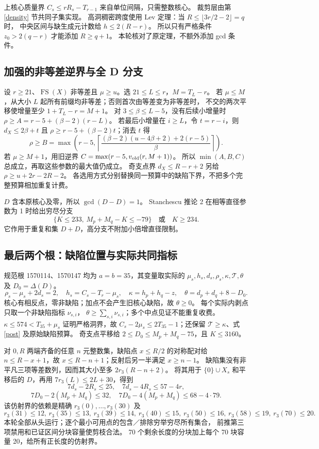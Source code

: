 \documentclass[11pt,a4paper]{article}
\newcommand{\FS}{\operatorname{FS}}
\newcommand{\T}{\mathcal T}
\theoremstyle{definition}
\begin{document}
上核心质量界 $C_s\le rR_s-T_{r-1}$ 来自单位间隔，只需整数核心。
裁剪层由第 \ref{density} 节共同子集实现。
高洞稠密跨度使用 Lev 定理：当 $R\le\lfloor3r/2-2\rfloor=q$ 时，
中央区间与缺生成元计数给 $h\le2(R-r)$。
所以只有严格条件 $z_0>2(q-r)$ 才能添加 $R\ge q+1$。
本轮核对了原定理，不额外添加 gcd 条件。

\subsection{加强的非等差逆界与全 D 分支}
设 $r\ge21$、$\FS(X)$ 非等差且 $\mu\ge u$。选 $21\le L\le r$，$M=T_L-r$。
若 $\mu\le M$，从大小 $L$ 起所有前缀均非等差；否则首次由等差变为非等差时，
不交的两次平移使增量至少 $1+T_L-r=M+1$。
对 $3\le\beta\le L-5$，没有后续小增量时
$\rho\ge A=r-5+(\beta-2)(r-L)$。
若最后小增量在 $i\ge L$，令 $t=r-i$，则
$d_X\le2\beta+t$ 且 $\rho\ge r-5+(\beta-2)t$；消去 $t$ 得
\[
 \rho\ge B=\max\left(r-5,
 \left\lceil\frac{(\beta-2)(u-4\beta+2)+2(r-5)}\beta\right\rceil\right).
\]
若 $\mu\ge M+1$，用旧逆界 $C=\max(r-5,v_{\rm old}(r,M+1))$。
所以 $\min(A,B,C)$ 总成立，再取这些参数的最大值仍成立。
奇支点界 $d_X\le R-r+2$ 另给 $\rho\ge u+2r-2R-2$。
各选用方式分别替换同一预算中的缺陷下界，不把多个完整预算相加重复计费。

$D$ 含本原核心及零，所以 $\gcd(D-D)=1$。
Stanchescu 推论 2 在相等直径参数为 1 时给出穷尽分支
\[
 \{K\le233,\ M_p+M_q-K\le-79\}\quad\text{或}\quad K\ge234.
\]
它作用于重复和集 $D+D$，高分支不附加小倍增直径限制。

\subsection{最后两个根：缺陷位置与实际共同指标}
规范根 1570114、1570147 均为 $a=b=35$，其变量取实际的
$\mu_s,h_s,d_s,\rho_s,\kappa,\T,\theta$ 及 $D_0=\Delta(D)$。
\[
 \rho_s-\mu_s+2d_s=2,\quad h_s=C_s-T_r-\mu_s,\quad
 \kappa=h_p+h_q-z,\quad \theta=d_p+d_q+8-D_0.
\]
核心有相反点，零非缺陷；加点不会产生旧核心缺陷，故 $\theta\ge0$。
每个实际内剥点只取一个非缺陷指标 $\nu_{s,i}$，
$\theta\ge\sum_{s,i}\nu_{s,i}$；多个中点见证不能重复收费。
$\kappa\le574<T_{35}+\mu_s$ 证明严格洞界，故
$C_s-2\mu_s\le2T_{35}-1$；还保留 $\T\ge\kappa$、式 \eqref{post} 及原始缺陷预算。
奇支点平移给 $2\le D_0\le M_p+M_q-75$，且 $K\le3160$。

对 $0,R$ 两端齐备的任意 $n$ 元整数集，缺陷点 $x\le R/2$ 的对称配对给
$n\le R-x+1$，故 $x\le R-n+1$；反射后另一半满足 $x\ge n-1$。
缺陷集没有非平凡三项等差数列，因而其大小至多 $2r_3(R-n+2)$。
将其用于 $\{0\}\cup X_s$ 和平移后的 $D$，再用
$7r_3(L)\le2L+30$，得到
\[
 7d_s-2R_s\le25,\quad7d_s-4R_s\le57-4r,
\]
\[
 7D_0-2(M_p+M_q)\le32,\quad7D_0-4(M_p+M_q)\le68-4\cdot79.
\]
该仿射界的依赖是精确 $r_3(0),\ldots,r_3(30)$ 及
\[
 r_3(31)\le12,~r_3(35)\le13,~r_3(39)\le14,~r_3(40)\le15,
 ~r_3(50)\le16,~r_3(58)\le19,~r_3(70)\le20.
\]
本轮全部从头运行；逐个最小可用点的包含／排除穷举穷尽所有集合，
前推第三项禁用和已证区间分块容量使剪枝合法。
70 个剩余长度的分块加上每个 70 块容量 20，给所有正长度的仿射界。
\end{document}
